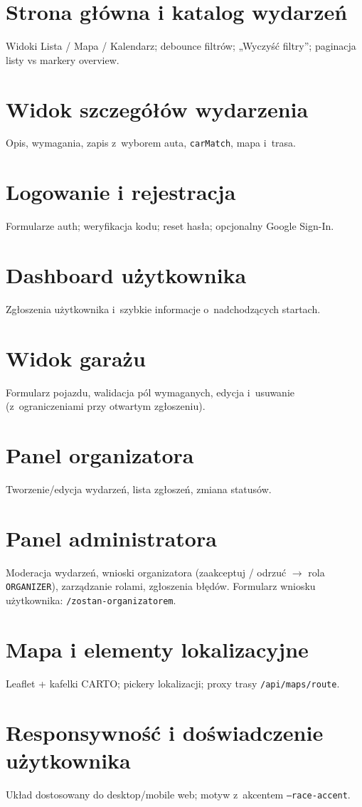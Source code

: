 \documentclass{sprz}
\begin{document}
\section{Strona główna i katalog wydarzeń}  
Widoki Lista / Mapa / Kalendarz; debounce filtrów; „Wyczyść filtry”; paginacja listy vs markery overview.  
\section{Widok szczegółów wydarzenia}  
Opis, wymagania, zapis z~wyborem auta, \texttt{carMatch}, mapa i~trasa.  
\section{Logowanie i rejestracja}  
Formularze auth; weryfikacja kodu; reset hasła; opcjonalny Google Sign-In.  
\section{Dashboard użytkownika}  
Zgłoszenia użytkownika i~szybkie informacje o~nadchodzących startach.  
\section{Widok garażu}  
Formularz pojazdu, walidacja pól wymaganych, edycja i~usuwanie (z~ograniczeniami przy otwartym zgłoszeniu).  
\section{Panel organizatora}  
Tworzenie/edycja wydarzeń, lista zgłoszeń, zmiana statusów.  
\section{Panel administratora}  
Moderacja wydarzeń, wnioski organizatora (zaakceptuj / odrzuć $\rightarrow$ rola \texttt{ORGANIZER}), zarządzanie rolami, zgłoszenia błędów. Formularz wniosku użytkownika: \texttt{/zostan-organizatorem}.  
\section{Mapa i elementy lokalizacyjne}  
Leaflet + kafelki CARTO; pickery lokalizacji; proxy trasy \texttt{/api/maps/route}.  
\section{Responsywność i doświadczenie użytkownika}  
Układ dostosowany do desktop/mobile web; motyw z~akcentem \texttt{--race-accent}.  
  
\end{document}
